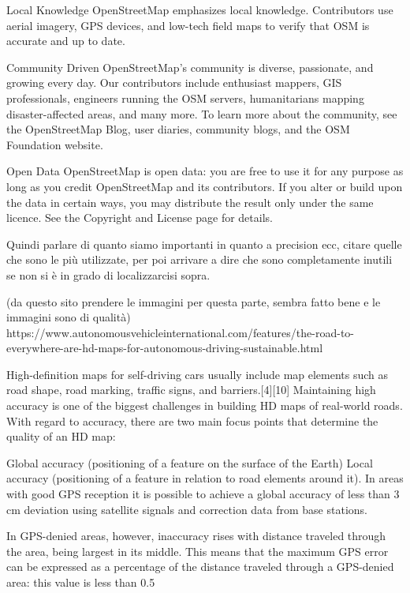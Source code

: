 Local Knowledge
OpenStreetMap emphasizes local knowledge. Contributors use aerial imagery, GPS devices, and low-tech field maps to verify that OSM is accurate and up to date.

Community Driven
OpenStreetMap's community is diverse, passionate, and growing every day. Our contributors include enthusiast mappers, GIS professionals, engineers running the OSM servers, humanitarians mapping disaster-affected areas, and many more. To learn more about the community, see the OpenStreetMap Blog, user diaries, community blogs, and the OSM Foundation website.

Open Data
OpenStreetMap is open data: you are free to use it for any purpose as long as you credit OpenStreetMap and its contributors. If you alter or build upon the data in certain ways, you may distribute the result only under the same licence. See the Copyright and License page for details.

Quindi parlare di quanto siamo importanti in quanto a precision ecc, citare quelle che sono le più utilizzate, per poi arrivare a dire che sono completamente inutili se non si è in grado di localizzarcisi sopra. 

(da questo sito prendere le immagini per questa parte, sembra fatto bene e le immagini sono di qualità)
https://www.autonomousvehicleinternational.com/features/the-road-to-everywhere-are-hd-maps-for-autonomous-driving-sustainable.html












High-definition maps for self-driving cars usually include map elements such as road shape, road marking, traffic signs, and barriers.[4][10] Maintaining high accuracy is one of the biggest challenges in building HD maps of real-world roads. With regard to accuracy, there are two main focus points that determine the quality of an HD map:

Global accuracy (positioning of a feature on the surface of the Earth)
Local accuracy (positioning of a feature in relation to road elements around it).
In areas with good GPS reception it is possible to achieve a global accuracy of less than 3 cm deviation using satellite signals and correction data from base stations.

In GPS-denied areas, however, inaccuracy rises with distance traveled through the area, being largest in its middle. This means that the maximum GPS error can be expressed as a percentage of the distance traveled through a GPS-denied area: this value is less than 0.5%


